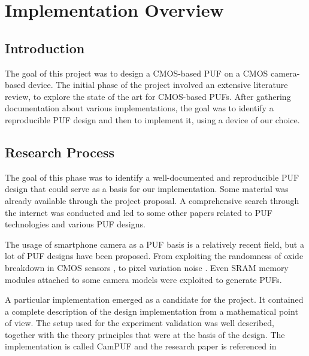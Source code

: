 \chapter{Implementation Overview}
\section{Introduction}
The goal of this project was to design a CMOS-based PUF on a CMOS camera-based device.
The initial phase of the project involved an extensive literature review, to explore the state of the art for CMOS-based PUFs.
After gathering documentation about various implementations, the goal was to identify a reproducible PUF design and then to implement it, using a device of our choice.

\section{Research Process}
The goal of this phase was to identify a well-documented and reproducible PUF design that could serve as a basis for our implementation.
Some material was already available through the project proposal. A comprehensive search through the internet was conducted and led to some other papers
related to PUF technologies and various PUF designs.

The usage of smartphone camera as a PUF basis is a relatively recent field, but a lot of PUF designs have been proposed. From exploiting the randomness of oxide breakdown in CMOS
sensors \cite{oxidecmosPUF}, to pixel variation noise \cite{pixelvarPUF}. Even SRAM memory modules attached to some camera models were exploited to generate PUFs\cite{SRAMPUF}.

A particular implementation emerged as a candidate for the project. It contained a complete description of the design implementation from a mathematical point of view.
The setup used for the experiment validation was well described, together with the theory principles that were at the basis of the design.
The implementation is called CamPUF and the research paper is referenced in \cite{campuf}


